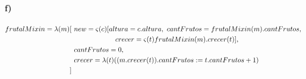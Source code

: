 \documentclass[10pt,a4paper]{article}
\begin{document}
\paragraph{f)}
\begin{align*}
frutalMixin = \lambda(m)[~& new = \varsigma(c)[altura = c.altura,~cantFrutos = frutalMixin(m).cantFrutos,~\\
&\qquad\qquad\qquad crecer = \varsigma(t)frutalMixin(m).crecer(t)], \\
&cantFrutos = 0, \\
&crecer = \lambda(t)((m.crecer(t)).cantFrutos := t.cantFrutos+1) \\
]~&\\
\end{align*}
\end{document}
